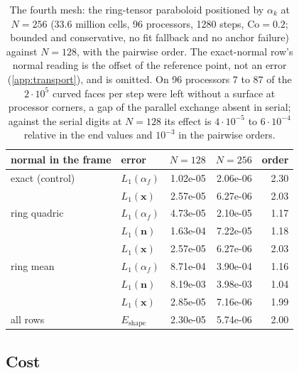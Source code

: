 \begin{table}[htbp]
\centering
\caption{The fourth mesh: the ring-tensor paraboloid positioned by $\alpha_k$ at $N = 256$ ($33.6$ million cells, 96 processors, 1280 steps, $\mathrm{Co} = 0.2$; bounded and conservative, no fit fallback and no anchor failure) against $N = 128$, with the pairwise order. The exact-normal row's normal reading is the offset of the reference point, not an error (\ref{app:transport}), and is omitted. On 96 processors $7$ to $87$ of the $2\cdot10^5$ curved faces per step were left without a surface at processor corners, a gap of the parallel exchange absent in serial; against the serial digits at $N = 128$ its effect is $4\cdot10^{-5}$ to $6\cdot10^{-4}$ relative in the end values and $10^{-3}$ in the pairwise orders.}
\label{tab:tpf-n256}
\footnotesize
\begin{tabular}{llrrr}
\toprule
normal in the frame & error & $N = 128$ & $N = 256$ & order \\
\midrule
exact (control) & $L_1(\alpha_f)$ & 1.02e-05 & 2.06e-06 & 2.30 \\
 & $L_1(\mathbf{x})$ & 2.57e-05 & 6.27e-06 & 2.03 \\
ring quadric & $L_1(\alpha_f)$ & 4.73e-05 & 2.10e-05 & 1.17 \\
 & $L_1(\mathbf{n})$ & 1.63e-04 & 7.22e-05 & 1.18 \\
 & $L_1(\mathbf{x})$ & 2.57e-05 & 6.27e-06 & 2.03 \\
ring mean & $L_1(\alpha_f)$ & 8.71e-04 & 3.90e-04 & 1.16 \\
 & $L_1(\mathbf{n})$ & 8.19e-03 & 3.98e-03 & 1.04 \\
 & $L_1(\mathbf{x})$ & 2.85e-05 & 7.16e-06 & 1.99 \\
all rows & $E_{\mathrm{shape}}$ & 2.30e-05 & 5.74e-06 & 2.00 \\
\bottomrule
\end{tabular}
\end{table}

\subsection{Cost}
\label{sec:tpf-cost}

